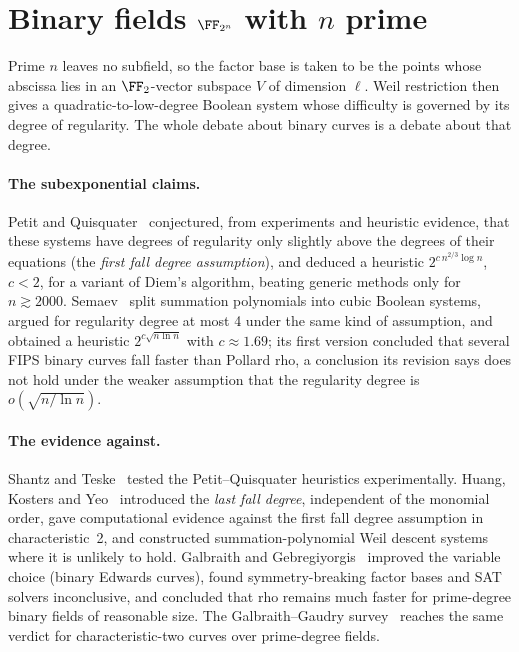 \section{Binary fields $\FF_{2^n}$ with $n$ prime}

Prime $n$ leaves no subfield, so the factor base is taken to be the points
whose abscissa lies in an $\FF_2$-vector subspace $V$ of dimension $\ell$.
Weil restriction then gives a quadratic-to-low-degree Boolean system whose
difficulty is governed by its degree of regularity. The whole debate about
binary curves is a debate about that degree.

\paragraph{The subexponential claims.} Petit and
Quisquater~\cite{petit2012} conjectured, from experiments and heuristic
evidence, that these systems have degrees of regularity only slightly above
the degrees of their equations (the \emph{first fall degree assumption}),
and deduced a heuristic $2^{c\,n^{2/3}\log n}$, $c<2$, for a variant of
Diem's algorithm, beating generic methods only for $n\gtrsim2000$.
Semaev~\cite{semaev2015} split summation polynomials into cubic Boolean
systems, argued for regularity degree at most 4 under the same kind of
assumption, and obtained a heuristic $2^{c\sqrt{n\ln n}}$ with
$c\approx1.69$; its first version concluded that several FIPS binary curves
fall faster than Pollard rho, a conclusion its revision says does not hold
under the weaker assumption that the regularity degree is
$o(\sqrt{n/\ln n})$.

\paragraph{The evidence against.} Shantz and Teske~\cite{shantz2013}
tested the Petit--Quisquater heuristics experimentally. Huang, Kosters and
Yeo~\cite{hky2015} introduced the \emph{last fall degree}, independent of
the monomial order, gave computational evidence against the first fall
degree assumption in characteristic~2, and constructed summation-polynomial
Weil descent systems where it is unlikely to hold. Galbraith and
Gebregiyorgis~\cite{galbraith2014} improved the variable choice (binary
Edwards curves), found symmetry-breaking factor bases and SAT solvers
inconclusive, and concluded that rho remains much faster for prime-degree
binary fields of reasonable size. The Galbraith--Gaudry
survey~\cite{galbraith2016} reaches the same verdict for characteristic-two
curves over prime-degree fields.

